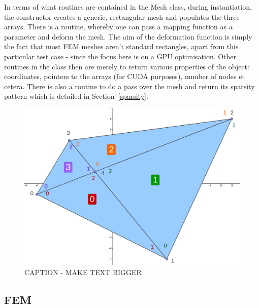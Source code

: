In terms of what routines are contained in the Mesh class, during instantiation, the constructor creates a generic, rectangular mesh and populates the three arrays. There is a routine, whereby one can pass a mapping function as a parameter and deform the mesh. The aim of the deformation function is simply the fact that most FEM meshes aren't standard rectangles, apart from this particular test case - since the focus here is on a GPU optimisation. Other routines in the class then are merely to return various properties of the object: coordinates, pointers to the arrays (for CUDA purposes), number of nodes et cetera. There is also a routine to do a pass over the mesh and return its sparsity pattern which is detailed in Section~\ref{sparsity}.
\begin{figure}
	\centering
	\includegraphics[width = 0.5\linewidth]{Figures/4cell_example}
	\caption{CAPTION - MAKE TEXT BIGGER}
	\label{fig:4cell}
\end{figure}
\subsection{FEM}

